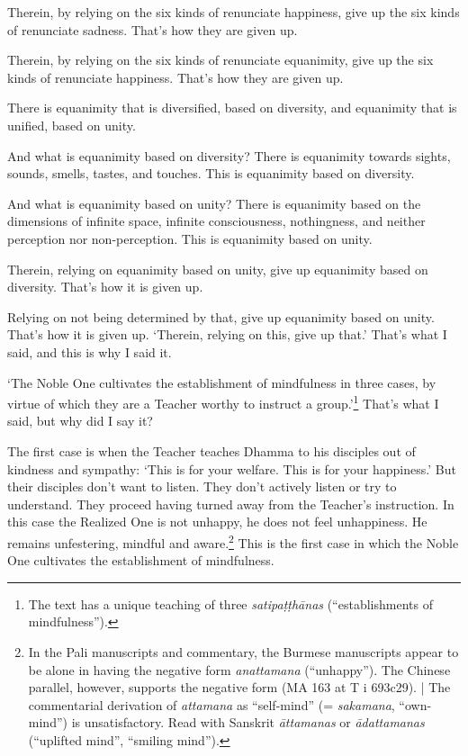 \documentclass[12pt,openany]{book}%
\begin{document}
Therein, by relying on the six kinds of renunciate happiness, give up the six kinds of renunciate sadness. That’s how they are given up. 

Therein, by relying on the six kinds of renunciate equanimity, give up the six kinds of renunciate happiness. That’s how they are given up. 

There is equanimity that is diversified, based on diversity, and equanimity that is unified, based on unity. 

And what is equanimity based on diversity? There is equanimity towards sights, sounds, smells, tastes, and touches. This is equanimity based on diversity. 

And what is equanimity based on unity? There is equanimity based on the dimensions of infinite space, infinite consciousness, nothingness, and neither perception nor non-perception. This is equanimity based on unity. 

Therein, relying on equanimity based on unity, give up equanimity based on diversity. That’s how it is given up. 

Relying on not being determined by that, give up equanimity based on unity. That’s how it is given up. ‘Therein, relying on this, give up that.’ That’s what I said, and this is why I said it. 

‘The Noble One cultivates the establishment of mindfulness in three cases, by virtue of which they are a Teacher worthy to instruct a group.’\footnote{The text has a unique teaching of three \textit{\textsanskrit{satipaṭṭhānas}} (“establishments of mindfulness”). } That’s what I said, but why did I say it? 

The first case is when the Teacher teaches Dhamma to his disciples out of kindness and sympathy: ‘This is for your welfare. This is for your happiness.’ But their disciples don’t want to listen. They don’t actively listen or try to understand. They proceed having turned away from the Teacher’s instruction. In this case the Realized One is not unhappy, he does not feel unhappiness. He remains unfestering, mindful and aware.\footnote{In the Pali manuscripts and commentary, the Burmese manuscripts appear to be alone in having the negative form \textit{anattamana} (“unhappy”). The Chinese parallel, however, supports the negative form (MA 163 at T i 693c29). | The commentarial derivation of \textit{attamana} as “self-mind” (= \textit{sakamana}, “own-mind”) is unsatisfactory. Read with Sanskrit \textit{\textsanskrit{āttamanas}} or \textit{\textsanskrit{ādattamanas}} (“uplifted mind”, “smiling mind”). } This is the first case in which the Noble One cultivates the establishment of mindfulness. 
\end{document}
